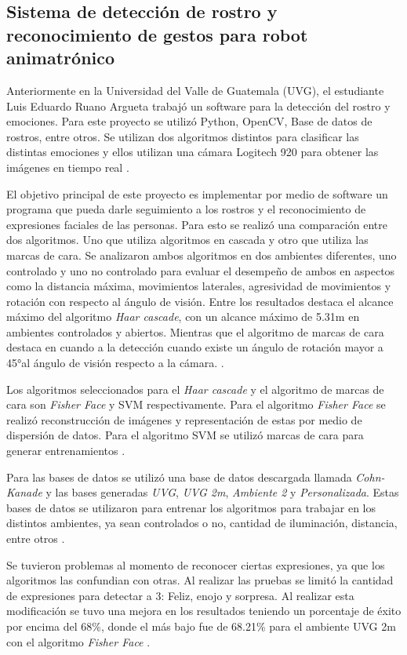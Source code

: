 \subsection*{Sistema de detección de rostro y reconocimiento de gestos para robot animatrónico}
Anteriormente en la Universidad del Valle de Guatemala (UVG), el estudiante Luis Eduardo Ruano Argueta trabajó un software para la detección del rostro y emociones. Para este proyecto se utilizó Python, OpenCV, Base de datos de rostros, entre otros. Se utilizan dos algoritmos distintos para clasificar las distintas emociones y ellos utilizan una cámara Logitech 920 para obtener las imágenes en tiempo real \cite{Ruano2019Tesis}.

El objetivo principal de este proyecto es implementar por medio de software un programa que pueda darle seguimiento a los rostros y el reconocimiento de expresiones faciales de las personas. Para esto se realizó una comparación entre dos algoritmos. Uno que utiliza algoritmos en cascada y otro que utiliza las marcas de cara. Se analizaron ambos algoritmos en dos ambientes diferentes, uno controlado y uno no controlado para evaluar el desempeño de ambos en aspectos como la distancia máxima, movimientos laterales, agresividad de movimientos y rotación con respecto al ángulo de visión. Entre los resultados destaca el alcance máximo del algoritmo \textit{Haar cascade}, con un alcance máximo de 5.31m en ambientes controlados y abiertos. Mientras que el algoritmo de marcas de cara destaca en cuando a la detección cuando existe un ángulo de rotación mayor a 45°al ángulo de visión respecto a la cámara. \cite{Ruano2019Tesis}.

Los algoritmos seleccionados para el \textit{Haar cascade} y el algoritmo de marcas de cara son \textit{Fisher Face} y SVM respectivamente. Para el algoritmo \textit{Fisher Face} se realizó reconstrucción de imágenes y representación de estas por medio de dispersión de datos. Para el algoritmo SVM se utilizó marcas de cara para generar entrenamientos \cite{Ruano2019Tesis}.

Para las bases de datos se utilizó una base de datos descargada llamada \textit{Cohn-Kanade} y las bases generadas \textit{UVG}, \textit{UVG 2m}, \textit{Ambiente 2} y \textit{Personalizada}. Estas bases de datos se utilizaron para entrenar los algoritmos para trabajar en los distintos ambientes, ya sean controlados  o no, cantidad de iluminación, distancia, entre otros \cite{Ruano2019Tesis}.

Se tuvieron problemas al momento de reconocer ciertas expresiones, ya que los algoritmos las confundian con otras. Al realizar las pruebas se limitó la cantidad de expresiones para detectar a 3: Feliz, enojo y sorpresa. Al realizar esta modificación se tuvo una mejora en los resultados teniendo un porcentaje de éxito por encima del 68\%, donde el más bajo fue de 68.21\% para el ambiente UVG 2m con el algoritmo \textit{Fisher Face} \cite{Ruano2019Tesis}.

